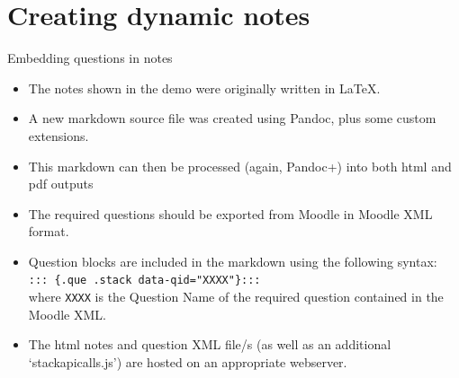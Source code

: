 \documentclass[hyperref={colorlinks = true, urlcolor = magenta}]{beamer}
\theoremstyle{definition}
\theoremstyle{plain}
\begin{document}
\section{Creating dynamic notes} %
\label{sec:creating_dynamic_notes}

\begin{frame}[t,fragile]{Embedding questions in notes}
    \begin{itemize}
        \item<1-> The notes shown in the demo were originally written in \LaTeX{}.
        \item<2-> A new markdown source file was created using Pandoc, plus some custom extensions. 
        \item<4-> This markdown can then be processed (again, Pandoc+) into both html and pdf outputs 
        \item<6-> The required questions should be exported from Moodle in Moodle XML format.
        \item<7-> Question blocks are included in the markdown using the following syntax:\\
    \hspace{2em}\verb|::: {.que .stack data-qid="XXXX"}:::| \\
    where \verb|XXXX| is the Question Name of the required question contained in the Moodle XML.
        
        \item<9->The html notes and question XML file/s (as well as an additional `stackapicalls.js') are hosted on an appropriate webserver.
    \end{itemize}    
\end{frame}
\end{document}

